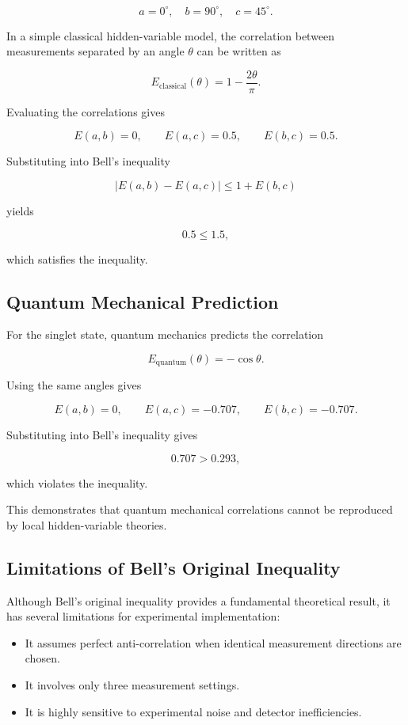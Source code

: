\documentclass[14pt,a4paper]{extarticle}
\begin{document}
\[
a = 0^\circ, \quad b = 90^\circ, \quad c = 45^\circ.
\]

In a simple classical hidden-variable model, the correlation between measurements separated by an angle $\theta$ can be written as

\[
E_{\text{classical}}(\theta) = 1 - \frac{2\theta}{\pi}.
\]

Evaluating the correlations gives

\[
E(a,b) = 0, \qquad E(a,c) = 0.5, \qquad E(b,c) = 0.5.
\]

Substituting into Bell’s inequality

\[
|E(a,b) - E(a,c)| \le 1 + E(b,c)
\]

yields

\[
0.5 \le 1.5,
\]

which satisfies the inequality.


\subsection{Quantum Mechanical Prediction}

For the singlet state, quantum mechanics predicts the correlation

\[
E_{\text{quantum}}(\theta) = -\cos \theta.
\]

Using the same angles gives

\[
E(a,b) = 0, \qquad
E(a,c) = -0.707, \qquad
E(b,c) = -0.707.
\]

Substituting into Bell’s inequality gives

\[
0.707 > 0.293,
\]

which violates the inequality.

This demonstrates that quantum mechanical correlations cannot be reproduced by local hidden-variable theories.


\subsection{Limitations of Bell's Original Inequality}

Although Bell’s original inequality provides a fundamental theoretical result, it has several limitations for experimental implementation:

\begin{itemize}
\item It assumes perfect anti-correlation when identical measurement directions are chosen.
\item It involves only three measurement settings.
\item It is highly sensitive to experimental noise and detector inefficiencies.
\end{itemize}
\end{document}
